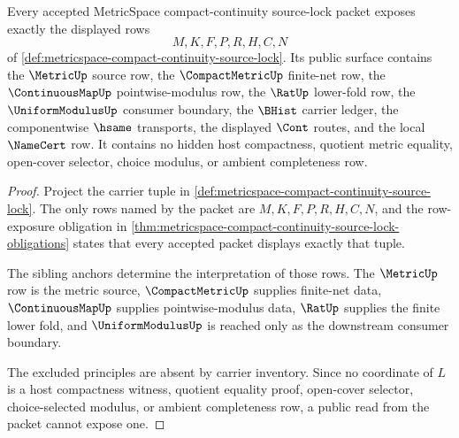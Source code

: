 \begin{theorem}
\label{thm:metricspace-source-lock-row-exposure}
Every accepted MetricSpace compact-continuity source-lock packet exposes exactly the displayed rows
$$
M,K,F,P,R,H,C,N
$$
of \autoref{def:metricspace-compact-continuity-source-lock}. Its public surface contains the $\MetricUp$ source row, the $\CompactMetricUp$ finite-net row, the $\ContinuousMapUp$ pointwise-modulus row, the $\RatUp$ lower-fold row, the $\UniformModulusUp$ consumer boundary, the $\BHist$ carrier ledger, the componentwise $\hsame$ transports, the displayed $\Cont$ routes, and the local $\NameCert$ row. It contains no hidden host compactness, quotient metric equality, open-cover selector, choice modulus, or ambient completeness row.
\end{theorem}
\begin{proof}
Project the carrier tuple in \autoref{def:metricspace-compact-continuity-source-lock}. The only rows named by the packet are $M,K,F,P,R,H,C,N$, and the row-exposure obligation in \autoref{thm:metricspace-compact-continuity-source-lock-obligations} states that every accepted packet displays exactly that tuple.

The sibling anchors determine the interpretation of those rows. The $\MetricUp$ row is the metric source, $\CompactMetricUp$ supplies finite-net data, $\ContinuousMapUp$ supplies pointwise-modulus data, $\RatUp$ supplies the finite lower fold, and $\UniformModulusUp$ is reached only as the downstream consumer boundary.

The excluded principles are absent by carrier inventory. Since no coordinate of $L$ is a host compactness witness, quotient equality proof, open-cover selector, choice-selected modulus, or ambient completeness row, a public read from the packet cannot expose one.
\end{proof}

